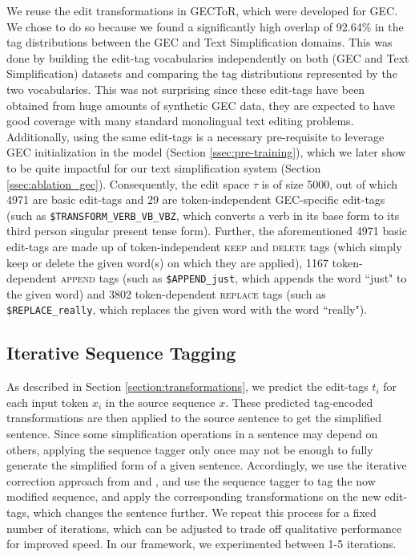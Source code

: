 \documentclass[11pt,a4paper]{article}
\begin{document}
We reuse the edit transformations in GECToR, which were developed for GEC. We chose to do so because we found a significantly high overlap of 92.64\% in the tag distributions between the GEC and Text Simplification domains. This was done by building the edit-tag vocabularies independently on both (GEC and Text Simplification) datasets and comparing the tag distributions represented by the two vocabularies. This was not surprising since these edit-tags have been obtained from huge amounts of synthetic GEC data, they are expected to have good coverage with many standard monolingual text editing problems. Additionally, using the same edit-tags is a necessary pre-requisite to leverage GEC initialization in the model (Section \ref{ssec:pre-training}), which we later show to be quite impactful for our text simplification system (Section \ref{ssec:ablation_gec}). Consequently, the edit space $\tau$ is of size 5000, out of which 4971 are basic edit-tags and 29 are token-independent GEC-specific edit-tags (such as \texttt{\$TRANSFORM_VERB_VB_VBZ}, which converts a verb in its base form to its third person singular present tense form). Further, the aforementioned 4971 basic edit-tags are made up of token-independent \textsc{keep} and \textsc{delete} tags (which simply keep or delete the given word(s) on which they are applied), 1167 token-dependent \textsc{append} tags (such as \texttt{\$APPEND_just}, which appends the word ``just" to the given word) and 3802 token-dependent \textsc{replace} tags (such as \texttt{\$REPLACE_really}, which replaces the given word with the word ``really"). 





\subsection{Iterative Sequence Tagging}
\label{ssec:iterative_tagging}
As described in Section \ref{section:transformations}, 
we predict the edit-tags $t_i$ for each input token $x_i$ in the source sequence $x$. These predicted tag-encoded transformations are then applied to the source sentence to get the simplified sentence. Since some simplification operations in a sentence may depend on others, applying the sequence tagger only once may not be enough to fully generate the simplified form of a given sentence. Accordingly, we use the iterative correction approach from \citet{awasthi-etal-2019-parallel} and \citet{omelianchuk-etal-2020-gector}, and use the sequence tagger to tag the now modified sequence, and apply the corresponding transformations on the new edit-tags, which changes the sentence further. We repeat this process for a fixed number of iterations, which can be adjusted to trade off qualitative performance for improved speed. In our framework, we experimented between 1-5 iterations.
\end{document}
